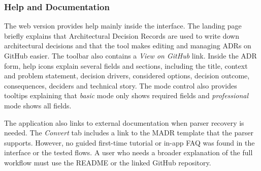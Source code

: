 \documentclass{article}
\begin{document}
\subsubsection{Help and Documentation}
The web version provides help mainly inside the interface. The landing page briefly explains that Architectural Decision Records are used to write down architectural decisions and that the tool makes editing and managing ADRs on GitHub easier. The toolbar also contains a \textit{View on GitHub} link. Inside the ADR form, help icons explain several fields and sections, including the title, context and problem statement, decision drivers, considered options, decision outcome, consequences, deciders and technical story. The mode control also provides tooltips explaining that \textit{basic} mode only shows required fields and \textit{professional} mode shows all fields.

The application also links to external documentation when parser recovery is needed. The \textit{Convert} tab includes a link to the MADR template that the parser supports. However, no guided first-time tutorial or in-app FAQ was found in the interface or the tested flows. A user who needs a broader explanation of the full workflow must use the README or the linked GitHub repository.
\end{document}
